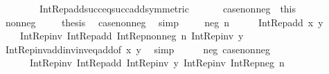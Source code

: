 \begin{isabellebody}
\ \ \ \ \ \ \ \ Int{\isacharunderscore}{\kern0pt}Rep{\isacharunderscore}{\kern0pt}add{\isacharunderscore}{\kern0pt}succ{\isacharunderscore}{\kern0pt}eq{\isacharunderscore}{\kern0pt}succ{\isacharunderscore}{\kern0pt}add{\isacharbrackleft}{\kern0pt}symmetric{\isacharbrackright}{\kern0pt}{\isacharparenright}{\kern0pt}\isanewline
\ \ \isacommand{{\isacharbraceright}{\kern0pt}}\isamarkupfalse%
\isanewline
\ \ \isamarkupfalse%
\ case{\isacharunderscore}{\kern0pt}nonneg\ {\isacharequal}{\kern0pt}\ this\isanewline
\ \ \isacommand{{\isacharbraceleft}{\kern0pt}}\isamarkupfalse%
\ \isamarkupfalse%
\ {\isacharparenleft}{\kern0pt}nonneg\ {\isacharunderscore}{\kern0pt}{\isacharparenright}{\kern0pt}\ \isamarkupfalse%
\ \isamarkupfalse%
\ {\isacharquery}{\kern0pt}thesis\ \isamarkupfalse%
\ case{\isacharunderscore}{\kern0pt}nonneg\ \isamarkupfalse%
\ simp\ \isacommand{{\isacharbraceright}{\kern0pt}}\isamarkupfalse%
\isanewline
\ \ \isamarkupfalse%
\ {\isacharparenleft}{\kern0pt}neg\ n{\isacharparenright}{\kern0pt}\isanewline
\ \ \isamarkupfalse%
\ \isamarkupfalse%
\ {\isachardoublequoteopen}Int{\isacharunderscore}{\kern0pt}Rep{\isacharunderscore}{\kern0pt}add\ x\ y\ {\isacharequal}{\kern0pt}\isanewline
\ \ \ \ Int{\isacharunderscore}{\kern0pt}Rep{\isacharunderscore}{\kern0pt}inv\ {\isacharparenleft}{\kern0pt}Int{\isacharunderscore}{\kern0pt}Rep{\isacharunderscore}{\kern0pt}add\ {\isacharparenleft}{\kern0pt}Int{\isacharunderscore}{\kern0pt}Rep{\isacharunderscore}{\kern0pt}nonneg\ n{\isacharparenright}{\kern0pt}\ {\isacharparenleft}{\kern0pt}Int{\isacharunderscore}{\kern0pt}Rep{\isacharunderscore}{\kern0pt}inv\ y{\isacharparenright}{\kern0pt}{\isacharparenright}{\kern0pt}{\isachardoublequoteclose}\isanewline
\ \ \ \ \isamarkupfalse%
\ Int{\isacharunderscore}{\kern0pt}Rep{\isacharunderscore}{\kern0pt}inv{\isacharunderscore}{\kern0pt}add{\isacharunderscore}{\kern0pt}inv{\isacharunderscore}{\kern0pt}inv{\isacharunderscore}{\kern0pt}eq{\isacharunderscore}{\kern0pt}add{\isacharbrackleft}{\kern0pt}of\ x\ y{\isacharbrackright}{\kern0pt}\ \isamarkupfalse%
\ simp\isanewline
\ \ \isamarkupfalse%
\ \isamarkupfalse%
\ neg\ case{\isacharunderscore}{\kern0pt}nonneg\ \isamarkupfalse%
\isanewline
\ \ \ \ {\isachardoublequoteopen}{\isachardot}{\kern0pt}{\isachardot}{\kern0pt}{\isachardot}{\kern0pt}\ {\isacharequal}{\kern0pt}\ Int{\isacharunderscore}{\kern0pt}Rep{\isacharunderscore}{\kern0pt}inv\ {\isacharparenleft}{\kern0pt}Int{\isacharunderscore}{\kern0pt}Rep{\isacharunderscore}{\kern0pt}add\ {\isacharparenleft}{\kern0pt}Int{\isacharunderscore}{\kern0pt}Rep{\isacharunderscore}{\kern0pt}inv\ y{\isacharparenright}{\kern0pt}\ {\isacharparenleft}{\kern0pt}Int{\isacharunderscore}{\kern0pt}Rep{\isacharunderscore}{\kern0pt}inv\ {\isacharparenleft}{\kern0pt}Int{\isacharunderscore}{\kern0pt}Rep{\isacharunderscore}{\kern0pt}neg\ n{\isacharparenright}{\kern0pt}{\isacharparenright}{\kern0pt}{\isacharparenright}{\kern0pt}{\isachardoublequoteclose}\isanewline

\end{isabellebody}
